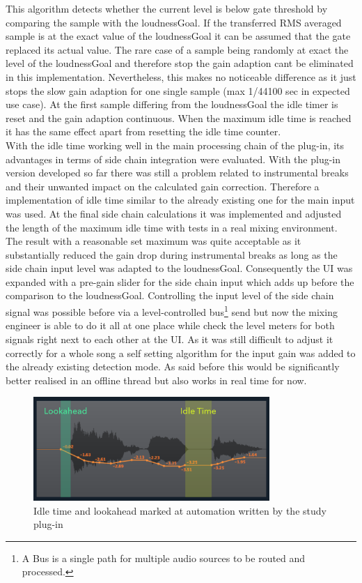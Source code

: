 This algorithm detects whether the current level is below gate threshold by comparing the sample with the loudnessGoal. If the transferred RMS averaged sample is at the exact value of the loudnessGoal it can be assumed that the gate replaced its actual value. The rare case of a sample being randomly at exact the level of the loudnessGoal and therefore stop the gain adaption cant be eliminated in this implementation. Nevertheless, this makes no noticeable difference as it just stops the slow gain adaption for one single sample (max 1/44100 sec in expected use case). At the first sample differing from the loudnessGoal the idle timer is reset and the gain adaption continuous. When the maximum idle time is reached it has the same effect apart from resetting the idle time counter.\\
With the idle time working well in the main processing chain of the plug-in, its advantages in terms of side chain integration were evaluated. With the plug-in version developed so far there was still a problem related to instrumental breaks and their unwanted impact on the calculated gain correction. Therefore a implementation of idle time similar to the already existing one for the main input was used. At the final side chain calculations it was implemented and adjusted the length of the maximum idle time with tests in a real mixing environment. The result with a reasonable set maximum was quite acceptable as it substantially reduced the gain drop during instrumental breaks as long as the side chain input level was adapted to the loudnessGoal. Consequently the UI was expanded with a pre-gain slider for the side chain input which adds up before the comparison to the loudnessGoal. Controlling the input level of the side chain signal was possible before via a level-controlled bus\footnote{A Bus is a single path for multiple audio sources to be routed and processed.} send but now the mixing engineer is able to do it all at one place while check the level meters for both signals right next to each other at the UI. As it was still difficult to adjust it correctly for a whole song a self setting algorithm for the input gain was added to the already existing detection mode. As said before this would be significantly better realised in an offline thread but also works in real time for now.\\

\begin{figure}[H]
\includegraphics[width=0.8\textwidth]{images/automation2LookIdle}
	\centering
	\caption{Idle time and lookahead marked at automation written by the study plug-in}
\end{figure}

